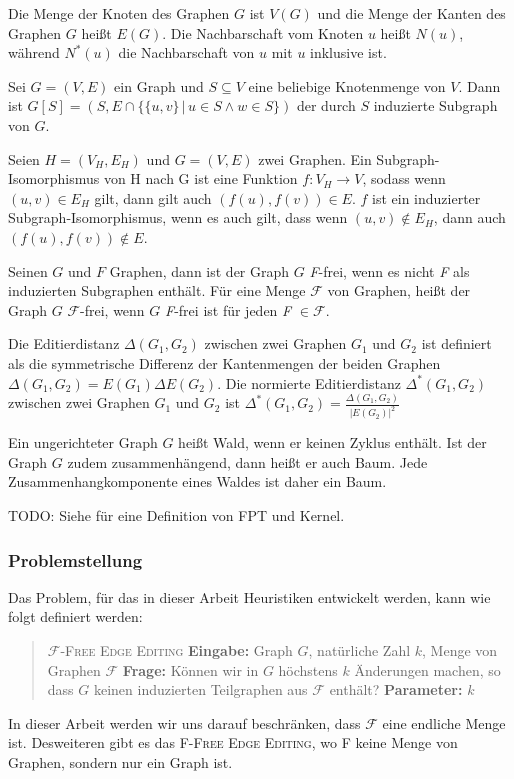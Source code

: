 \documentclass[12pt,a4paper,onecolumn,oneside,titlepage]{article}
\newcommand\cursive[1]{\ensuremath{\mathcal{#1}}}
\begin{document}
Die Menge der Knoten des Graphen $G$ ist $V(G)$ und die Menge der Kanten des Graphen $G$ heißt $E(G)$. Die Nachbarschaft vom Knoten $u$ heißt $N(u)$, während $N^{*}(u)$ die Nachbarschaft von $u$ mit $u$ inklusive ist.

Sei $G = (V,E)$ ein Graph und $S \subseteq V$ eine beliebige Knotenmenge von $V$. 
Dann ist $G[S] = (S, E \cap \{\{u,v\} \,|\, u \in S \land w \in S\})$ der durch $S$ induzierte Subgraph von $G$.

Seien $H = (V_H,E_H)$ und $G =(V,E)$ zwei Graphen. Ein Subgraph-Isomorphismus von H nach G ist eine Funktion $f : V_H \rightarrow V$, sodass wenn $(u,v) \in E_H $ gilt, dann gilt auch $(f(u),f(v)) \in E$. $f$ ist ein induzierter Subgraph-Isomorphismus, wenn es auch gilt, dass wenn $(u,v) \notin E_H$, dann auch $(f(u),f(v)) \notin E$.

Seinen $G$ und $F$ Graphen, dann ist der Graph $G$ \textit{F}-frei, wenn es nicht \textit{F} als induzierten Subgraphen enthält.
Für eine Menge \cursive{F} von Graphen, heißt der Graph $G$ \cursive{F}-frei, wenn $G$ \textit{F}-frei ist für jeden \textit{F} $\in \cursive{F}$.

Die Editierdistanz  $\Delta(G_1,G_2)$ zwischen zwei Graphen $G_1$ und $G_2$ ist definiert als die symmetrische Differenz der Kantenmengen der beiden Graphen $\Delta(G_1,G_2) = E(G_1) \Delta E(G_2)$. Die normierte Editierdistanz $\Delta^{*}(G_1,G_2)$ zwischen zwei Graphen $G_1$ und $G_2$ ist  $\Delta^{*}(G_1,G_2) =  \frac{\Delta(G_1,G_2)}{|E(G_2)|^2}$


Ein ungerichteter Graph $G$ heißt Wald, wenn er keinen Zyklus enthält. Ist der Graph $G$ zudem zusammenhängend, dann heißt er auch Baum. Jede Zusammenhangkomponente eines Waldes ist daher ein Baum.

TODO: Siehe \cite{Cai96} für eine Definition von FPT und Kernel.
\subsubsection{Problemstellung}
\label{sec:problem}
Das Problem, für das in dieser Arbeit Heuristiken entwickelt werden, kann wie folgt definiert werden:
\begin{quote}
  \textsc{\cursive{F}-Free Edge Editing}\newline
  \textbf{Eingabe:} Graph $G$, natürliche Zahl $k$, Menge von Graphen \cursive{F}\newline
  \textbf{Frage:} Können wir in $G$ höchstens $k$ Änderungen machen, so dass $G$ keinen induzierten Teilgraphen aus \cursive{F} enthält?\newline
  \textbf{Parameter:} $k$
\end{quote}
In dieser Arbeit werden wir uns darauf beschränken, dass \cursive{F} eine endliche Menge ist.
Desweiteren gibt es das \textsc{F-Free Edge Editing}, wo \textsc{F} keine Menge von Graphen, sondern nur ein Graph ist. \\
\end{document}
